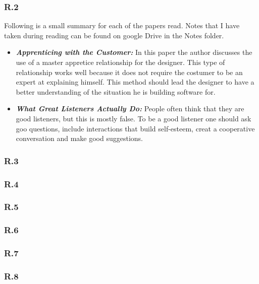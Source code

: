 \documentclass[]{article}
\begin{document}
\subsubsection*{R.2}
Following is a small summary for each of the papers read. 
Notes that I have taken during reading can be found on google Drive in the Notes folder.

\begin{itemize}
    \item[] \textbf{\textit{Apprenticing with the Customer: }}
    In this paper the author discusses the use of a master appretice relationship 
    for the designer. This type of relationship works well because it does not require
    the costumer to be an expert at explaining himself. This method should lead the 
    designer to have a better understanding of the situation he is building software for.
     
    \item[] \textbf{\textit{What Great Listeners Actually Do: }}
    People often think that they are good listeners, but this is mostly false.
    To be a good listener one should ask goo questions, include interactions that
    build self-esteem, creat a cooperative conversation and make good suggestions.
    
\end{itemize}
\subsubsection*{R.3}

\subsubsection*{R.4}

\subsubsection*{R.5}

\subsubsection*{R.6}

\subsubsection*{R.7}

\subsubsection*{R.8}
\end{document}
